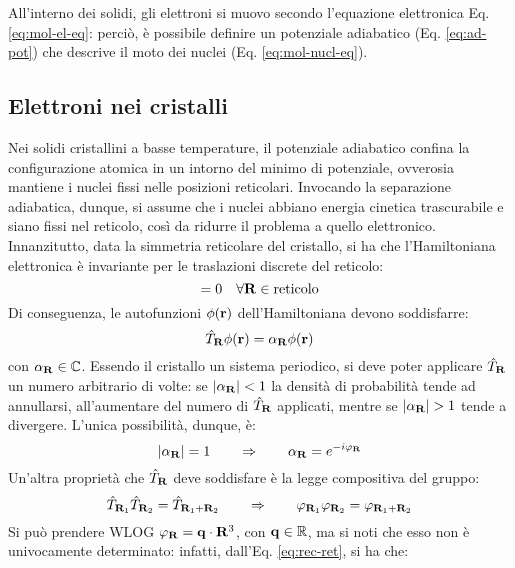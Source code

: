 All'interno dei solidi, gli elettroni si muovo secondo l'equazione elettronica Eq. \ref{eq:mol-el-eq}: perciò, è possibile definire un potenziale adiabatico (Eq. \ref{eq:ad-pot}) che descrive il moto dei nuclei (Eq. \ref{eq:mol-nucl-eq}).

\subsection{Elettroni nei cristalli}

Nei solidi cristallini a basse temperature, il potenziale adiabatico confina la configurazione atomica in un intorno del minimo di potenziale, ovverosia mantiene i nuclei fissi nelle posizioni reticolari. Invocando la separazione adiabatica, dunque, si assume che i nuclei abbiano energia cinetica trascurabile e siano fissi nel reticolo, così da ridurre il problema a quello elettronico. \\
Innanzitutto, data la simmetria reticolare del cristallo, si ha che l'Hamiltoniana elettronica è invariante per le traslazioni discrete del reticolo:
\begin{equation}
	[\hat{\mathcal{H}} , \hat{T}_\ve{R}] = 0 \quad \forall \ve{R} \in \text{reticolo}
\end{equation}
Di conseguenza, le autofunzioni $ \phi(\mathbf{r}) $ dell'Hamiltoniana devono soddisfarre:
\begin{equation}
	\hat{T}_{\mathbf{R}} \phi(\mathbf{r}) = \alpha_{\mathbf{R}} \phi(\mathbf{r})
\end{equation}
con $ \alpha_{\mathbf{R}} \in \mathbb{C} $. Essendo il cristallo un sistema periodico, si deve poter applicare $ \hat{T}_{\mathbf{R}} $ un numero arbitrario di volte: se $ \left\lvert\alpha_{\mathbf{R}}\right\rvert < 1 $ la densità di probabilità tende ad annullarsi, all'aumentare del numero di $ \hat{T}_{\mathbf{R}} $ applicati, mentre se $ \left\lvert\alpha_{\mathbf{R}}\right\rvert > 1 $ tende a divergere. L'unica possibilità, dunque, è:
\begin{equation*}
	\left\lvert\alpha_{\mathbf{R}}\right\rvert = 1
	\qquad \Rightarrow \qquad
	\alpha_{\mathbf{R}} = e^{-i \varphi_{\mathbf{R}}}
\end{equation*}
Un'altra proprietà che $ \hat{T}_{\mathbf{R}} $ deve soddisfare è la legge compositiva del gruppo:
\begin{equation*}
	\hat{T}_{\mathbf{R}_1} \hat{T}_{\mathbf{R}_2} = \hat{T}_{\mathbf{R}_1 + \mathbf{R}_2}
	\qquad \Rightarrow \qquad
	\varphi_{\mathbf{R}_1} \varphi_{\mathbf{R}_2} = \varphi_{\mathbf{R}_1 + \mathbf{R}_2}
\end{equation*}
Si può prendere WLOG $ \varphi_{\mathbf{R}} = \mathbf{q} \cdot \mathbf{R}^3 $, con $ \mathbf{q} \in \mathbb{R} $, ma si noti che esso non è univocamente determinato: infatti, dall'Eq. \ref{eq:rec-ret}, si ha che:
